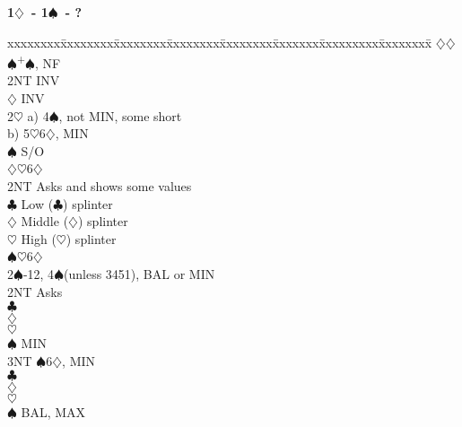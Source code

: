 \documentclass[10pt]{article}
\renewcommand{\c}{$\clubsuit$}
\renewcommand{\d}{$\diamondsuit$}
\newcommand{\h}{$\heartsuit$}
\newcommand{\s}{$\spadesuit$}
\newcommand{\p}{\textsuperscript{+}}
\newenvironment{bidtable}[1][]
{\textbf{#1}
  \begin{adjustwidth}{1em}{}
    \addvspace{2pt}
    \begin{tabbing}
      xxxxxxxx\=xxxxxxxx\=xxxxxxxx\=xxxxxxxx\=xxxxxxxx\=xxxxxxx\=xxxxxxxxx\=xxxxxxxx\=\kill}
{\end{tabbing}\end{adjustwidth}\bigskip}%
\begin{document}
\begin{bidtable}[1\d\ - 1\s\ - ?]
     \>      \d {}\d                                           \\
     \s  {}\p\s, NF                                            \\
     \> 2NT  \> INV                                                  \\
     \d  \> INV                                                  \\
2\h  \> a) 4\s, not MIN, some short                                  \\
     \> b) 5\h 6\d, MIN                                              \\
     \s  \> S/O                                                  \\
     \>      \d {}\h 6\d                                       \\
     \> 2NT  \> Asks and shows some values                           \\
     \>      \c \> Low (\c) splinter                             \\
     \>      \d \> Middle (\d) splinter                          \\
     \>      \h \> High (\h) splinter                            \\
     \>      \s {}\h 6\d                                       \\
2\s  {}-12, 4\s (unless 3451), BAL or MIN                         \\
     \> 2NT  \> Asks                                                 \\
     \>      \c {}                                          \\
     \>      \d {}                                          \\
     \>      \h {}                                          \\
     \>      \s \> MIN                                           \\
     \>      \> 3NT \s 6\d, MIN                                  \\
     \>      \c {}                                          \\
     \>      \d {}                                          \\
     \>      \h {}                                          \\
     \>      \s \> BAL, MAX                                      \\

\end{bidtable}
\end{document}
